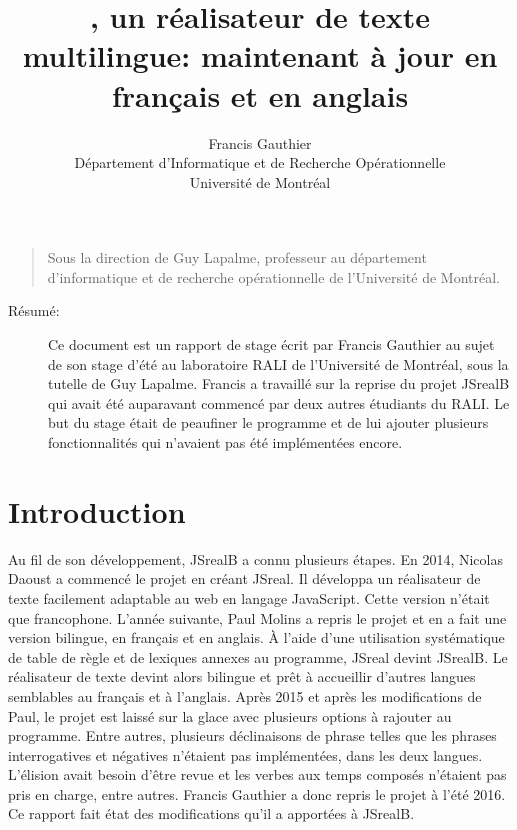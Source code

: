 \documentclass[11pt]{article} %
\title{\JSB{}, un réalisateur de texte multilingue: maintenant à jour en
français et en anglais}
\author{Francis Gauthier\\Département d'Informatique et de Recherche Opérationnelle\\Université de Montréal}
\newcommand{\system}[1]{\textsf{#1}}
\newcommand{\JSB}{\system{JSrealB}}
\begin{document}
\maketitle


\begin{verse}
Sous la direction de Guy Lapalme, professeur au département d'informatique
et de recherche opérationnelle de l'Université de Montréal.
\end{verse}
\begin{description}
\item [{Résumé:}] Ce document est un rapport de stage écrit par Francis
Gauthier au sujet de son stage d'été au laboratoire RALI de l'Université
de Montréal, sous la tutelle de Guy Lapalme. Francis a travaillé sur
la reprise du projet \JSB{} qui avait été auparavant commencé par
deux autres étudiants du RALI. Le but du stage était de peaufiner
le programme et de lui ajouter plusieurs fonctionnalités qui n'avaient
pas été implémentées encore. 
\end{description}



\pagebreak
\begin{verse}
\tableofcontents{}
\end{verse}
\pagebreak


\section{Introduction}

Au fil de son développement, \JSB{} a connu plusieurs étapes. En
2014, Nicolas Daoust a commencé le projet en créant \system{JSreal}\cite{nicRapport}. Il développa
un réalisateur de texte facilement adaptable au web en langage JavaScript.
Cette version n'était que francophone. L'année suivante, Paul Molins 
a repris le projet et en a fait une version bilingue, en français
et en anglais\cite{paulRapport}. À l'aide d'une utilisation systématique de table de
règle et de lexiques annexes au programme, \system{JSreal} devint \JSB{}.
Le réalisateur de texte devint alors bilingue et prêt à accueillir
d'autres langues semblables au français et à l'anglais. Après 2015
et après les modifications de Paul, le projet est laissé sur la glace
avec plusieurs options à rajouter au programme. Entre autres, plusieurs
déclinaisons de phrase telles que les phrases interrogatives et négatives
n'étaient pas implémentées, dans les deux langues. L'élision avait
besoin d'être revue et les verbes aux temps composés n'étaient pas
pris en charge, entre autres. Francis Gauthier a donc repris le projet
à l'été 2016. Ce rapport fait état des modifications qu'il a apportées
à \JSB{}.
\end{document}
